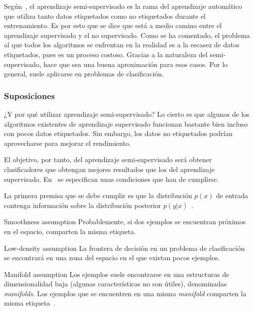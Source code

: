 Según~\cite{vanEngelen2020}, el aprendizaje semi-supervisado es la rama del
aprendizaje automático que utiliza tanto datos etiquetados como no etiquetados 
durante el entrenamiento. Es por esto que se dice que está a medio camino entre 
el aprendizaje supervisado y el no supervisado. Como se ha comentado, el problema
al que todos los algoritmos se enfrentan en la realidad es a la escasez de datos 
etiquetados, pues es un proceso costoso. Gracias a la naturaleza del semi-supervisado,
hace que sea una buena aproximación para esos casos. Por lo general, suele aplicarse 
en problemas de clasificación.

\subsubsection{Suposiciones}
¿Y por qué utilizar aprendizaje semi-supervisado? Lo cierto es que algunos
de los algoritmos existentes de aprendizaje supervisado funcionan bastante bien
incluso con pocos datos etiquetados. Sin embargo, los datos no etiquetados podrían
aprovecharse para mejorar el rendimiento.

El objetivo, por tanto, del aprendizaje semi-supervisado será obtener clasificadores
que obtengan mejores resultados que los del aprendizaje supervisado. En~\cite{vanEngelen2020}
se especifican unas condiciones que han de cumplirse.

La primera premisa que se debe cumplir es que la distribución $p(x)$ de entrada contenga
información sobre la distribución posterior $p(y|x)$~\cite{vanEngelen2020}.

\begin{mainbox}{Smoothness assumption}
    Probablemente, si dos ejemplos se encuentran próximos en el espacio, comparten
    la misma etiqueta.
\end{mainbox}

\medskip

\begin{mainbox}{Low-density assumption}
    La frontera de decisión en un problema de clasificación se encontrará en una zona del espacio
    en el que existan pocos ejemplos.
\end{mainbox}

\medskip

\begin{mainbox}{Manifold assumption}
    Los ejemplos suele encontrarse en una estructuras de dimensionalidad baja (algunas características
    no son útiles), denominadas \emph{manifolds}. Los ejemplos que se encuentren en una misma \emph{manifold} comparten la misma etiqueta~\cite{towardsdatascience:semi,vanEngelen2020}.
\end{mainbox}

